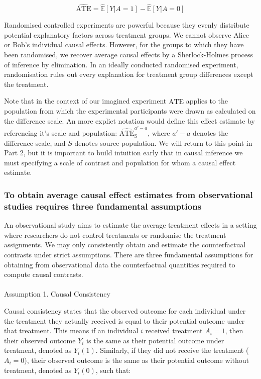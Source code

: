 \documentclass[
  single column]{article}
\makeatletter
\let\oldparagraph\paragraph
\renewcommand{\paragraph}{
    \@ifstar
      \xxxParagraphStar
      \xxxParagraphNoStar
  }
\newcommand{\xxxParagraphStar}[1]{\oldparagraph*{#1}\mbox{}}
\newcommand{\xxxParagraphNoStar}[1]{\oldparagraph{#1}\mbox{}}
\makeatother
\begin{document}
\[
\widehat{\text{ATE}} = \widehat{\mathbb{E}}[Y | A = 1] - \widehat{\mathbb{E}}[Y | A = 0]
\]

Randomised controlled experiments are powerful because they evenly
distribute potential explanatory factors across treatment groups. We
cannot observe Alice or Bob's individual causal effects. However, for
the groups to which they have been randomised, we recover average causal
effects by a Sherlock-Holmes process of inference by elimination. In an
ideally conducted randomised experiment, randomisation rules out every
explanation for treatment group differences except the treatment.

Note that in the context of our imagined experiment
\(\widehat{\text{ATE}}\) applies to the population from which the
experimental participants were drawn as calculated on the difference
scale. An more explict notation would define this effect estimate by
referencing it's scale and population:
\(\widehat{\text{ATE}}^{a'-a}_{\text{S}}\), where \(a'-a\) denotes the
difference scale, and \(S\) denotes source population. We will return to
this point in Part 2, but it is important to build intuition early that
in causal inference we must specifying a scale of contrast and
population for whom a causal effect estimate.

\subsubsection{To obtain average causal effect estimates from
observational studies requires three fundamental
assumptions}\label{to-obtain-average-causal-effect-estimates-from-observational-studies-requires-three-fundamental-assumptions}

An observational study aims to estimate the average treatment effects in
a setting where researchers do not control treatments or randomise the
treatment assignments. We may only consistently obtain and estimate the
counterfactual contrasts under strict assumptions. There are three
fundamental assumptions for obtaining from observational data the
counterfactual quantities required to compute causal contrasts.

\paragraph{Assumption 1. Causal
Consistency}\label{assumption-1.-causal-consistency}

Causal consistency states that the observed outcome for each individual
under the treatment they actually received is equal to their potential
outcome under that treatment. This means if an individual \(i\) received
treatment \(A_i = 1\), then their observed outcome \(Y_i\) is the same
as their potential outcome under treatment, denoted as \(Y_i(1)\).
Similarly, if they did not receive the treatment (\(A_i = 0\)), their
observed outcome is the same as their potential outcome without
treatment, denoted as \(Y_i(0)\), such that:
\end{document}
